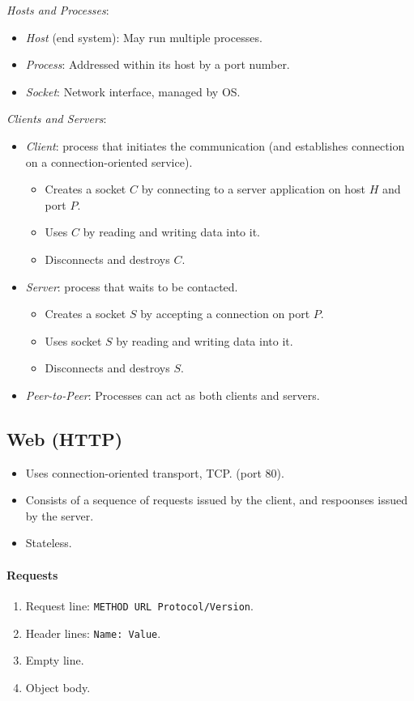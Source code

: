 \documentclass[twocolumn,english]{article}
\begin{document}
\emph{Hosts and Processes}:
\begin{itemize}
\item \emph{Host} (end system): May run multiple processes.
\item \emph{Process}: Addressed within its host by a port number.
\item \emph{Socket}: Network interface, managed by OS.
\end{itemize}
\emph{Clients and Servers}:
\begin{itemize}
\item \emph{Client}: process that initiates the communication (and establishes
connection on a connection-oriented service).
\begin{itemize}
\item Creates a socket $C$ by connecting to a server application on host
$H$ and port $P$.
\item Uses $C$ by reading and writing data into it.
\item Disconnects and destroys $C$.
\end{itemize}
\item \emph{Server}: process that waits to be contacted.
\begin{itemize}
\item Creates a socket $S$ by accepting a connection on port $P$.
\item Uses socket $S$ by reading and writing data into it.
\item Disconnects and destroys $S$.
\end{itemize}
\item \emph{Peer-to-Peer}: Processes can act as both clients and servers.
\end{itemize}

\subsection{Web (HTTP)}
\begin{itemize}
\item Uses connection-oriented transport, TCP. (port 80).
\item Consists of a sequence of requests issued by the client, and respoonses
issued by the server.
\item Stateless.
\end{itemize}

\paragraph{Requests}
\begin{enumerate}
\item Request line: \texttt{METHOD URL Protocol/Version}.
\item Header lines: \texttt{Name: Value}. 
\item Empty line.
\item Object body.
\end{enumerate}
\end{document}

